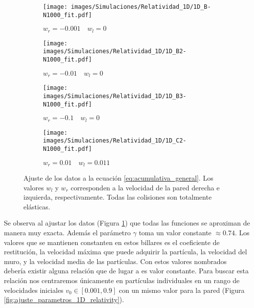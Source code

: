\vspace{3mm}

\begin{figure}[h]
    \begin{subfigure}[b]{0.5\textwidth}
        \centering
        \texttt{[image: images/Simulaciones/Relatividad\_1D/1D\_B-N1000\_fit.pdf]}
        \caption{$w_r = -0.001 \quad w_l = 0$}
    \end{subfigure}
    \hfill
    \begin{subfigure}[b]{0.5\textwidth}
        \centering
        \texttt{[image: images/Simulaciones/Relatividad\_1D/1D\_B2-N1000\_fit.pdf]}
        \caption{$w_r = -0.01 \quad w_l = 0$}
    \end{subfigure}
    \hfill
    \begin{subfigure}[b]{0.5\textwidth}
        \centering
        \texttt{[image: images/Simulaciones/Relatividad\_1D/1D\_B3-N1000\_fit.pdf]}
        \caption{$w_r = -0.1 \quad w_l = 0$}
    \end{subfigure}
    \hfill
    \begin{subfigure}[b]{0.5\textwidth}
        \centering
        \texttt{[image: images/Simulaciones/Relatividad\_1D/1D\_C2-N1000\_fit.pdf]}
        \caption{$w_r = 0.01 \quad w_l = 0.011$}
    \end{subfigure}
    \caption{Ajuste de los datos a la ecuación \ref{eq:acumulativa_general}. Los valores \( w_l \) y \( w_r \) corresponden a la velocidad de la pared derecha e izquierda, respectivamente. Todas las colisiones son totalmente elásticas.}
    \label{fig:ajuste_1D_relativity}
\end{figure}

\vspace{3mm}

Se observa al ajustar los datos (Figura \ref{fig:ajuste_1D_relativity}) que todas las funciones se aproximan de manera muy exacta. Además el parámetro \( \gamma \) toma un valor constante \( \approx 0.74 \). Los valores que se mantienen constanten en estos billares es el coeficiente de restitución, la velocidad máxima que puede adquirir la partícula, la velocidad del muro, y la velocidad media de las partículas. Con estos valores nombrados debería existir alguna relación que de lugar a es valor constante. Para buscar esta relación nos centraremos únicamente en partículas individuales en un rango de velocidades iniciales \( v_0 \in [0.001, 0.9] \) con un mismo valor para la pared (Figura \ref{fig:ajuste_parametros_1D_relativity}). 

